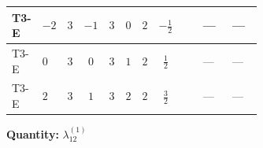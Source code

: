 \documentclass[8pt]{article}
\begin{document}
\begin{landscape}
\begin{longtable}{@{}llcccccc >{\raggedright\arraybackslash}p{0.21\linewidth} >{\raggedright\arraybackslash}p{0.21\linewidth} >{\raggedright\arraybackslash}p{0.21\linewidth}@{}}
\midrule
T3-E & $-2$ & $3$ & $-1$ & $3$ & $0$ & $2$ & $-\frac{1}{2}$ & \scriptsize\adjustbox{max width=\linewidth}{$\begin{gathered} +4 {\lambda_{HS_1}^{(1)}} {\lambda_{HS_2}^{(1)}}\end{gathered}$} & --- & --- \\
\midrule
T3-E & $0$ & $3$ & $0$ & $3$ & $1$ & $2$ & $\frac{1}{2}$ & \scriptsize\adjustbox{max width=\linewidth}{$\begin{gathered} +4 {\lambda_{HS_1}^{(1)}} {\lambda_{HS_2}^{(1)}}\end{gathered}$} & --- & --- \\
\midrule
T3-E & $2$ & $3$ & $1$ & $3$ & $2$ & $2$ & $\frac{3}{2}$ & \scriptsize\adjustbox{max width=\linewidth}{$\begin{gathered} +4 {\lambda_{HS_1}^{(1)}} {\lambda_{HS_2}^{(1)}}\end{gathered}$} & --- & --- \\
\midrule
\bottomrule
\end{longtable}
\clearpage
\noindent\textbf{Quantity: }$\lambda_{12}^{(1)}$\par\smallskip

\end{landscape}
\end{document}
